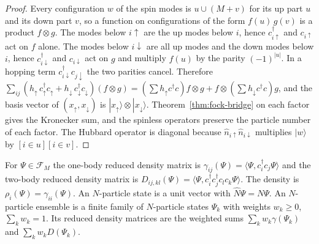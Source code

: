 \begin{proof}\leanok
  Every configuration $w$ of the spin modes is $u\cup(M+v)$ for its up part $u$ and its down part $v$, so a function on
  configurations of the form $f(u)\,g(v)$ is a product $f\otimes g$. The modes below $i{\uparrow}$ are the up modes below $i$,
  hence $c_{i\uparrow}^\dagger$ and $c_{i\uparrow}$ act on $f$ alone. The modes below $i{\downarrow}$ are all up modes and the down
  modes below $i$, hence $c_{i\downarrow}^\dagger$ and $c_{i\downarrow}$ act on $g$ and multiply $f(u)$ by the parity $(-1)^{|u|}$.
  In a hopping term $c_{i\downarrow}^\dagger c_{j\downarrow}$ the two parities cancel. Therefore
  $\sum_{ij}(h_\uparrow\,c^\dagger_\uparrow c_\uparrow+h_\downarrow\,c^\dagger_\downarrow c_\downarrow)(f\otimes g)
  =(\sum h_\uparrow c^\dagger c)f\otimes g+f\otimes(\sum h_\downarrow c^\dagger c)g$, and the basis vector of $(x_\uparrow,x_\downarrow)$
  is $|x_\uparrow\rangle\otimes|x_\downarrow\rangle$. Theorem~\ref{thm:fock-bridge} on each factor gives the Kronecker sum, and the
  spinless operators preserve the particle number of each factor. The Hubbard operator is diagonal because
  $\hat n_{i\uparrow}\hat n_{i\downarrow}$ multiplies $|w\rangle$ by $[i\in u][i\in v]$.
\end{proof}


\begin{definition}\label{def:rdm12}
  \leanok
  For $\Psi\in\mathcal F_M$ the one-body reduced density matrix is $\gamma_{ij}(\Psi)=\langle\Psi,c_i^\dagger c_j\Psi\rangle$ and the
  two-body reduced density matrix is $D_{ij,kl}(\Psi)=\langle\Psi,c_i^\dagger c_j^\dagger c_l c_k\Psi\rangle$. The density is
  $\rho_i(\Psi)=\gamma_{ii}(\Psi)$. An $N$-particle state is a unit vector with $\hat N\Psi=N\Psi$. An $N$-particle ensemble is a
  finite family of $N$-particle states $\Psi_k$ with weights $w_k\ge0$, $\sum_kw_k=1$. Its reduced density matrices are the
  weighted sums $\sum_kw_k\gamma(\Psi_k)$ and $\sum_kw_kD(\Psi_k)$.
\end{definition}

